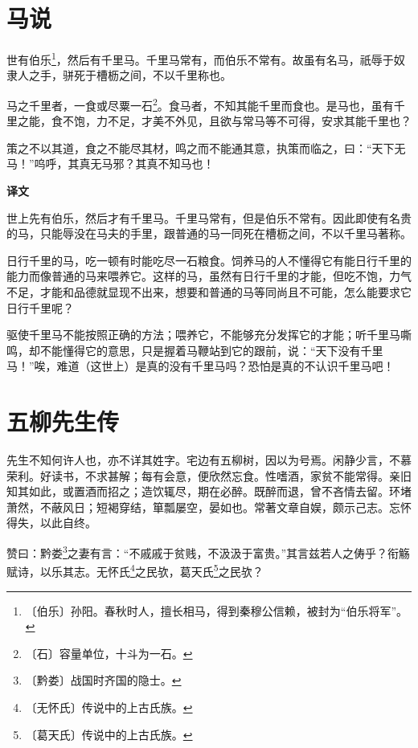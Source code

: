 \documentclass[12pt,UTF-8,openany,a4]{ctexbook}
\begin{document}
\chapter{马说}

\begin{large}
    
    世有伯乐\footnote{〔伯乐〕\yiwen 孙阳。春秋时人，擅长相马，得到秦穆公信赖，被封为“伯乐将军”。}，然后有千里马。千里马常有，而伯乐不常有。故虽有名马，祇辱于奴隶人之手，骈死于槽枥之间，不以千里称也。
    
    马之千里者，一食或尽粟一石\footnote{〔石〕\yiwen 容量单位，十斗为一石。}。食马者，不知其能千里而食也。是马也，虽有千里之能，食不饱，力不足，才美不外见，且欲与常马等不可得，安求其能千里也？
    
    策之不以其道，食之不能尽其材，鸣之而不能通其意，执策而临之，曰：“天下无马！”呜呼，其真无马邪？其真不知马也！
\end{large}


\newpage

\begin{Large}
    \noindent\textbf{译文}
\end{Large}


\vspace{1em}

\begin{large}
    \yiwen 
    世上先有伯乐，然后才有千里马。千里马常有，但是伯乐不常有。因此即使有名贵的马，只能辱没在马夫的手里，跟普通的马一同死在槽枥之间，不以千里马著称。
    
    日行千里的马，吃一顿有时能吃尽一石粮食。饲养马的人不懂得它有能日行千里的能力而像普通的马来喂养它。这样的马，虽然有日行千里的才能，但吃不饱，力气不足，才能和品德就显现不出来，想要和普通的马等同尚且不可能，怎么能要求它日行千里呢？
    
    驱使千里马不能按照正确的方法；喂养它，不能够充分发挥它的才能；听千里马嘶鸣，却不能懂得它的意思，只是握着马鞭站到它的跟前，说：“天下没有千里马！”唉，难道（这世上）是真的没有千里马吗？恐怕是真的不认识千里马吧！
    
\end{large}



\chapter{五柳先生传}

\begin{large}
    
    先生不知何许人也，亦不详其姓字。宅边有五柳树，因以为号焉。闲静少言，不慕荣利。好读书，不求甚解；每有会意，便欣然忘食。性嗜酒，家贫不能常得。亲旧知其如此，或置酒而招之；造饮辄尽，期在必醉。既醉而退，曾不吝情去留。环堵萧然，不蔽风日；短褐穿结，箪瓢屡空，晏如也。常著文章自娱，颇示己志。忘怀得失，以此自终。
    
    赞曰：黔娄\footnote{〔黔娄〕\yiwen 战国时齐国的隐士。}之妻有言：“不戚戚于贫贱，不汲汲于富贵。”其言兹若人之俦乎？衔觞赋诗，以乐其志。无怀氏\footnote{〔无怀氏〕\yiwen 传说中的上古氏族。}之民欤，葛天氏\footnote{〔葛天氏〕\yiwen 传说中的上古氏族。}之民欤？
\end{large}
\end{document}

